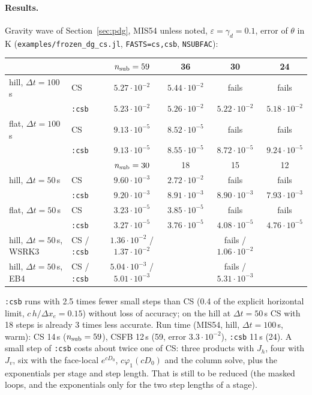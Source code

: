 \documentclass[11pt,a4paper]{article}
\newcommand{\dt}{\Delta t}
\newcommand{\code}[1]{\texttt{#1}}
\begin{document}
\paragraph{Results.} Gravity wave of Section~\ref{sec:pdg}, MIS54 unless noted, $\varepsilon=\gamma_d=0.1$, error of $\theta$ in K
(\code{examples/frozen\_dg\_cs.jl}, \code{FASTS=cs,csb}, \code{NSUBFAC}):
\begin{center}\footnotesize\setlength{\tabcolsep}{4pt}
\begin{tabular}{llcccc}\toprule
 & & $n_{\rm sub}=59$ & 36 & 30 & 24\\\midrule
hill, $\dt=100$\,s & CS & $5.27\cdot10^{-2}$ & $5.44\cdot10^{-2}$ & fails & fails\\
 & \code{:csb} & $5.23\cdot10^{-2}$ & $5.26\cdot10^{-2}$ & $5.22\cdot10^{-2}$ & $5.18\cdot10^{-2}$\\
flat, $\dt=100$\,s & CS & $9.13\cdot10^{-5}$ & $8.52\cdot10^{-5}$ & fails & fails\\
 & \code{:csb} & $9.13\cdot10^{-5}$ & $8.55\cdot10^{-5}$ & $8.72\cdot10^{-5}$ & $9.24\cdot10^{-5}$\\\midrule
 & & $n_{\rm sub}=30$ & 18 & 15 & 12\\\midrule
hill, $\dt=50$\,s & CS & $9.60\cdot10^{-3}$ & $2.72\cdot10^{-2}$ & fails & fails\\
 & \code{:csb} & $9.20\cdot10^{-3}$ & $8.91\cdot10^{-3}$ & $8.90\cdot10^{-3}$ & $7.93\cdot10^{-3}$\\
flat, $\dt=50$\,s & CS & $3.23\cdot10^{-5}$ & $3.85\cdot10^{-5}$ & fails & fails\\
 & \code{:csb} & $3.27\cdot10^{-5}$ & $3.76\cdot10^{-5}$ & $4.08\cdot10^{-5}$ & $4.76\cdot10^{-5}$\\\midrule
hill, $\dt=50$\,s, WSRK3 & CS / \code{:csb} & $1.36\cdot10^{-2}$ / $1.37\cdot10^{-2}$ & & fails / $1.06\cdot10^{-2}$ & \\
hill, $\dt=50$\,s, EB4 & CS / \code{:csb} & $5.04\cdot10^{-3}$ / $5.01\cdot10^{-3}$ & & fails / $5.31\cdot10^{-3}$ & \\\bottomrule
\end{tabular}
\end{center}
\code{:csb} runs with 2.5 times fewer small steps than CS (0.4 of the explicit horizontal limit, $c\,h/\Delta x_e=0.15$) without loss of
accuracy; on the hill at $\dt=50$\,s CS with 18 steps is already 3 times less accurate. Run time (MIS54, hill, $\dt=100$\,s, warm):
CS 14\,s ($n_{\rm sub}=59$), CSFB 12\,s (59, error $3.3\cdot10^{-2}$), \code{:csb} 11\,s (24). A small step of \code{:csb} costs about twice
one of CS: three products with $J_h$, four with $J_v$, six with the face-local $e^{cD_0}$, $c\varphi_1(cD_0)$ and the column solve, plus
the exponentials per stage and step length. That is still to be reduced (the masked loops, and the exponentials only for the two step
lengths of a stage).
\end{document}
